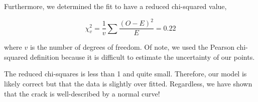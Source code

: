 \documentclass{article}
\begin{document}
Furthermore, we determined the fit to have a reduced chi-squared value,

\begin{equation}
    \chi^2_v = \frac{1}{v}\sum\frac{(O-E)^2}{E}= 0.22
\end{equation}

where $v$ is the number of degrees of freedom. Of note, we used the Pearson chi-squared definition because it is difficult to estimate the uncertainty of our points.

The reduced chi-squares is less than 1 and quite small. Therefore, our model is likely correct but that the data is slightly over fitted. Regardless, we have shown that the crack is well-described by a normal curve!



\nocite{*}
\end{document}
